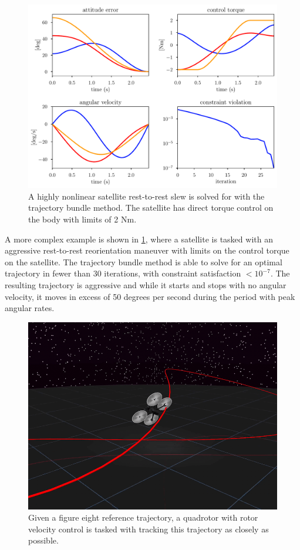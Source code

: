 \begin{figure}
    \centering
    \includegraphics[width=0.9\linewidth]{bundles/examples/satellite_fig_2.pdf}
    \caption{A highly nonlinear satellite rest-to-rest slew is solved for with the trajectory bundle method. The satellite has direct torque control on the body with limits of 2 Nm.}
    \label{fig:btb:satellite}
\end{figure}


A more complex example is shown in \ref{fig:btb:satellite}, where a satellite is tasked with an aggressive rest-to-rest reorientation maneuver with limits on the control torque on the satellite. The trajectory bundle method is able to solve for an optimal trajectory in fewer than 30 iterations, with constraint satisfaction $<10^{-7}$. The resulting trajectory is aggressive and while it starts and stops with no angular velocity, it moves in excess of 50 degrees per second during the period with peak angular rates.

\begin{figure}
    \centering
    \includegraphics[width=0.5\linewidth]{bundles/examples/drone_shot.png}
    \caption{Given a figure eight reference trajectory, a quadrotor with rotor velocity control is tasked with tracking this trajectory as closely as possible.}
    \label{fig:btb:drone_shot}
\end{figure}


